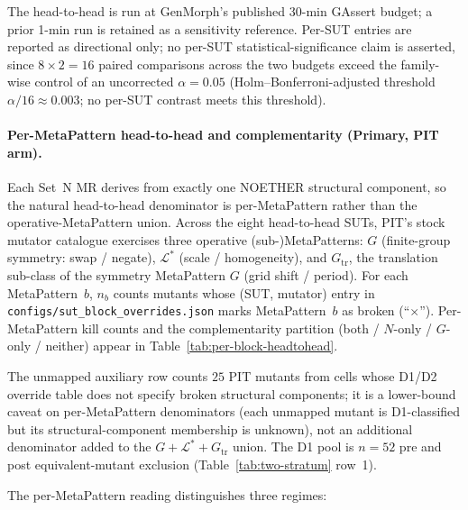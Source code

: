 \documentclass[acmsmall,screen,review]{acmart}
\begin{document}
The head-to-head is run at GenMorph's published 30-min GAssert budget;
a prior 1-min run is retained as a sensitivity reference. Per-SUT
entries are reported as directional only; no per-SUT
statistical-significance claim is asserted, since $8\times 2 = 16$
paired comparisons across the two budgets exceed the family-wise
control of an uncorrected $\alpha = 0.05$ (Holm--Bonferroni-adjusted
threshold $\alpha/16 \approx 0.003$; no per-SUT contrast meets this
threshold).

\paragraph{Per-MetaPattern head-to-head and complementarity (Primary, PIT arm).}
Each Set~N MR derives from exactly one NOETHER structural component, so the natural head-to-head denominator is per-MetaPattern rather than the operative-MetaPattern union. Across the eight head-to-head SUTs, PIT's stock mutator catalogue exercises three operative (sub-)MetaPatterns: $G$ (finite-group symmetry: swap / negate), $\mathcal{L}^{*}$ (scale / homogeneity), and $G_{\mathrm{tr}}$, the translation sub-class of the symmetry MetaPattern $G$ (grid shift / period). For each MetaPattern~$b$, $n_{b}$ counts mutants whose (SUT, mutator) entry in \texttt{configs/sut\_block\_overrides.json} marks MetaPattern~$b$ as broken (``$\times$''). Per-MetaPattern kill counts and the complementarity partition (both / $N$-only / $G$-only / neither) appear in Table~\ref{tab:per-block-headtohead}.

The unmapped auxiliary row counts $25$ PIT mutants from cells whose D1/D2 override table does not specify broken structural components; it is a lower-bound caveat on per-MetaPattern denominators (each unmapped mutant is D1-classified but its structural-component membership is unknown), not an additional denominator added to the $G + \mathcal{L}^{*} + G_{\mathrm{tr}}$ union. The D1 pool is $n = 52$ pre and post equivalent-mutant exclusion (Table~\ref{tab:two-stratum} row~1).

The per-MetaPattern reading distinguishes three regimes:
\end{document}

